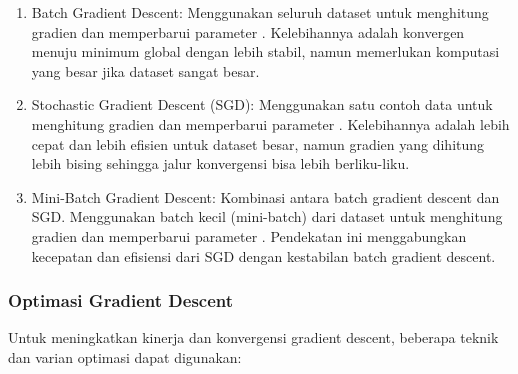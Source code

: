 \begin{enumerate}
    \item Batch Gradient Descent: Menggunakan seluruh dataset untuk menghitung gradien dan memperbarui parameter \cite{GoodBengCour16}. Kelebihannya adalah konvergen menuju minimum global dengan lebih stabil, namun memerlukan komputasi yang besar jika dataset sangat besar.
    
    \item Stochastic Gradient Descent (SGD): Menggunakan satu contoh data untuk menghitung gradien dan memperbarui parameter \cite{GoodBengCour16}. Kelebihannya adalah lebih cepat dan lebih efisien untuk dataset besar, namun gradien yang dihitung lebih bising sehingga jalur konvergensi bisa lebih berliku-liku.

    \item Mini-Batch Gradient Descent: Kombinasi antara batch gradient descent dan SGD. Menggunakan batch kecil (mini-batch) dari dataset untuk menghitung gradien dan memperbarui parameter \cite{GoodBengCour16}. Pendekatan ini menggabungkan kecepatan dan efisiensi dari SGD dengan kestabilan batch gradient descent.
\end{enumerate}

\subsubsection{Optimasi Gradient Descent}
Untuk meningkatkan kinerja dan konvergensi gradient descent, beberapa teknik dan varian optimasi dapat digunakan:

